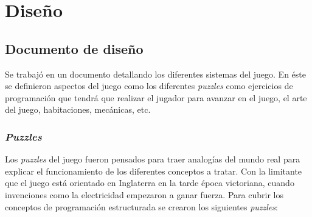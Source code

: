 \section{Diseño}
\subsection{Documento de diseño}
Se trabajó en un documento detallando los diferentes sistemas del juego. En éste se definieron aspectos del juego como los diferentes \textit{puzzles} como ejercicios de programación que tendrá que realizar el jugador para avanzar en el juego, el arte del juego, habitaciones, mecánicas, etc.

\subsubsection{\textit{Puzzles}}
Los \textit{puzzles} del juego fueron pensados para traer analogías del mundo real para explicar el funcionamiento de los diferentes conceptos a tratar. Con la limitante que el juego está orientado en Inglaterra en la tarde época victoriana, cuando invenciones como la electricidad empezaron a ganar fuerza.
Para cubrir los conceptos de programación estructurada se crearon los siguientes \textit{puzzles}:

